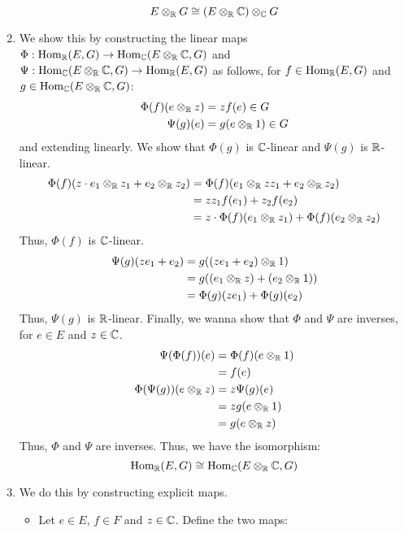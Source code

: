 \documentclass[12pt]{article}
\begin{document}
\begin{solution}
\begin{enumerate}
        \[E \otimes_\mathbb R G \cong (E \otimes_\mathbb R \mathbb C) \otimes_\mathbb C G\]
        \item We show this by constructing the linear maps $\Phi: \operatorname{Hom}_\mathbb R(E, G) \to \operatorname{Hom}_\mathbb C(E \otimes_\mathbb R \mathbb C, G)$ and $\Psi: \operatorname{Hom}_\mathbb C(E \otimes_\mathbb R \mathbb C, G) \to \operatorname{Hom}_\mathbb R(E, G)$ as follows, for $f \in \operatorname{Hom}_\mathbb R(E, G)$ and $g \in \operatorname{Hom}_\mathbb C(E \otimes_\mathbb R \mathbb C, G)$:
        \begin{align*}
            \Phi(f)(e \otimes_\mathbb R z) &= zf(e) \in G \\
            \Psi(g)(e) &= g(e \otimes_\mathbb R 1) \in G
        \end{align*}
        and extending linearly. We show that $\Phi(g)$ is $\mathbb C$-linear and $\Psi(g)$ is $\mathbb R$-linear. 
        \begin{align*}
            \Phi(f)(z \cdot e_1 \otimes_\mathbb R z_1 + e_2 \otimes_\mathbb R z_2) &= \Phi(f)(e_1 \otimes_\mathbb R zz_1 + e_2 \otimes_\mathbb R z_2) \\
            &= zz_1f(e_1) + z_2f(e_2) \\
            &= z\cdot \Phi(f)(e_1 \otimes_\mathbb R z_1)  + \Phi(f)(e_2 \otimes_\mathbb R z_2)
        \end{align*}
        Thus, $\Phi(f)$ is $\mathbb C$-linear.
        \begin{align*}
            \Psi(g)(ze_1 + e_2) &= g((ze_1+e_2) \otimes_\mathbb R 1) \\
            &= g((e_1 \otimes_\mathbb R z) + (e_2 \otimes_\mathbb R 1)) \\
            &= \Phi(g)(ze_1) + \Phi(g)(e_2)
        \end{align*}
        Thus, $\Psi(g)$ is $\mathbb R$-linear. Finally, we wanna show that $\Phi$ and $\Psi$ are inverses, for $e\in E$ and $z \in \mathbb C$. 
        \begin{align*}
            \Psi(\Phi(f))(e) &= \Phi(f)(e \otimes_\mathbb R 1) \\
            &= f(e) \\
            \Phi(\Psi(g))(e \otimes_\mathbb R z) &= z\Psi(g)(e) \\
            &= zg(e \otimes_\mathbb R 1) \\
            &= g(e \otimes_\mathbb R z)
        \end{align*}
        Thus, $\Phi$ and $\Psi$ are inverses. Thus, we have the isomorphism:
        \[\operatorname{Hom}_\mathbb R(E, G) \cong \operatorname{Hom}_\mathbb C(E \otimes_\mathbb R \mathbb C, G)\]
        \item We do this by constructing explicit maps. 
        \begin{itemize}
            \item Let $e \in E$, $f\in F$ and $z \in \mathbb C$. Define the two maps: 

\end{itemize}
\end{enumerate}
\end{solution}
\end{document}
